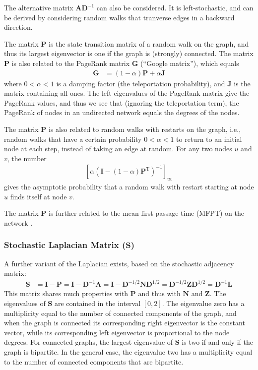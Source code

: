 \documentclass{article}
\begin{document}
The alternative matrix $\mathbf A \mathbf D^{-1}$ can also be
considered.  It is left-stochastic, and
can be derived by considering random walks that tranverse edges in a
backward direction. 

The matrix $\mathbf P$ is the state transition matrix of a random walk
on the graph, and thus its largest eigenvector is one if the graph is
(strongly) connected.  
The matrix $\mathbf P$ is also related to the PageRank matrix $\mathbf
G$ (``Google matrix''), which
equals 
\begin{align}
  \mathbf G &= (1-\alpha) \mathbf P + \alpha\mathbf J
\end{align}
where $0 < \alpha < 1$ is a damping factor (the teleportation
probability), and $\mathbf J$ is the matrix containing all ones.  The
left 
eigenvalues of the PageRank matrix give the PageRank values, and thus
we see that (ignoring the teleportation term), the PageRank of nodes in
an undirected network equals the degrees of the nodes. 

The matrix $\mathbf P$ is also related to random walks with restarts on
the graph, i.e., random walks that have a certain probability $0 <
\alpha < 1$
to return to an initial node at each step, instead of taking an edge at
random.  For any two nodes $u$ and $v$, the number
\begin{align}
  \left[\alpha  (\mathbf I - (1-\alpha) \mathbf P^{\mathrm T})^{-1}\right]_{uv}
\end{align}
gives the asymptotic probability that a random walk with restart starting at node $u$
finds itself at node $v$.  

The matrix $\mathbf P$ is further related to the mean first-passage time
(MFPT) on the network \citep{b880}.

\subsubsection{Stochastic Laplacian Matrix ($\mathbf S$)}
A further variant of the Laplacian exists, based on the stochastic
adjacency matrix:
\begin{align}
  \mathbf S &= \mathbf I - \mathbf P = \mathbf I - \mathbf D^{-1}
  \mathbf A = \mathbf I - \mathbf D^{-1/2} \mathbf N \mathbf D^{1/2} =
  \mathbf D^{-1/2} \mathbf Z \mathbf D^{1/2}
  = \mathbf D^{-1} \mathbf L
\end{align}
This matrix shares much properties with $\mathbf P$ and thus with
$\mathbf N$ and $\mathbf Z$.  The eigenvalues of $\mathbf S$ are
contained in the interval $[0, 2]$.  The eigenvalue zero has a
multiplicity equal to the number of connected components of the graph,
and when the graph is connected its corresponding right eigenvector is the
constant vector, while its corresponding left eigenvector is
proportional to the node degrees.  For connected graphs, the largest
eigenvalue of $\mathbf S$ is two if and only if the graph is bipartite.
In the general case, the eigenvalue two has a multiplicity equal to the
number of connected components that are bipartite. 
\end{document}

